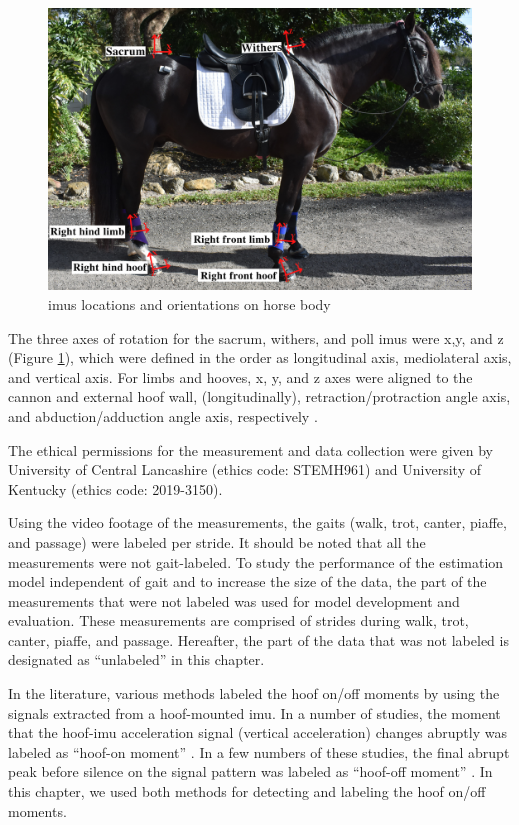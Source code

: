 \begin{figure}[!tb]
\centering
\includegraphics[width=.95\linewidth]{chapters/Step/figures/horse_step.png}
\caption{\gls{imu}s locations and orientations on horse body}
\label{horse}
\end{figure}

The three axes of rotation for the sacrum, withers, and poll \gls{imu}s were x,y, and z (Figure \ref{horse}), which were defined in the order as longitudinal axis, mediolateral axis, and vertical axis. For limbs and hooves, x, y, and z axes were aligned to the cannon and external hoof wall, (longitudinally), retraction/protraction angle axis, and abduction/adduction angle axis, respectively \cite{456}. 

The ethical permissions for the measurement and data collection were given by University of Central Lancashire (ethics code: STEMH961) and University of Kentucky (ethics code: 2019-3150).

Using the video footage of the measurements, the gaits (walk, trot, canter, piaffe, and passage) were labeled per stride. It should be noted that all the measurements were not gait-labeled. To study the performance of the estimation model independent of gait and to increase the size of the data, the part of the measurements that were not labeled was used for model development and evaluation. These measurements are comprised of strides during walk, trot, canter, piaffe, and passage. Hereafter, the part of the data that was not labeled is designated as “unlabeled” in this chapter.

In the literature, various methods labeled the hoof on/off moments by using the signals extracted from a hoof-mounted \gls{imu}. In a number of studies, the moment that the hoof-\gls{imu} acceleration signal (vertical acceleration) changes abruptly was labeled as “hoof-on moment” \cite{barstow_2018_does, hernlund_2013_hoof, chateau_2009_effects, holdendouilly_2013_equine, alsaaod_2017_the, witte_2004_determination, starke_2012_accuracy,adsd1}. In a few numbers of these studies, the final abrupt peak before silence on the signal pattern was labeled as “hoof-off moment” \cite{alsaaod_2017_the, witte_2004_determination, starke_2012_accuracy}. In this chapter, we used both methods for detecting and labeling the hoof on/off moments. 
	

